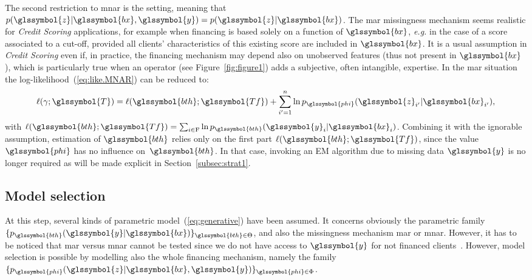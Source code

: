 The second restriction to \gls{mnar} is the  setting, meaning that $p(\glssymbol{z}| \glssymbol{bx},\glssymbol{y}) = p(\glssymbol{z}|\glssymbol{bx})$. The \gls{mar} missingness mechanism seems realistic for \textit{Credit Scoring} applications, for example when financing is based solely on a function of $\glssymbol{bx}$, {\it e.g.} in the case of a score associated to a cut-off, provided all clients' characteristics of this existing \gls{score} are included in $\glssymbol{bx}$. It is a usual assumption in \textit{Credit Scoring} even if, in practice, the financing mechanism may depend also on unobserved features (thus not present in $\glssymbol{bx}$), which is particularly true when an operator (see Figure~\ref{fig:figure1}) adds a subjective, often intangible, expertise. In the \gls{mar} situation the log-likelihood~(\ref{eq:like.MNAR}) can be reduced to:
\begin{equation}\label{eq:like.MAR}
\ell(\gamma;\glssymbol{T}) = \ell(\glssymbol{bth};\glssymbol{Tf}) + \sum_{i'=1}^n \ln p_{\glssymbol{phi}}(\glssymbol{z}_{i'} | \glssymbol{bx}_{i'}),
\end{equation}
with $\ell(\glssymbol{bth};\glssymbol{Tf})=\sum_{i\in\text{F}}\ln p_{\glssymbol{bth}}(\glssymbol{y}_i | \glssymbol{bx}_i)$.
Combining it with the ignorable assumption, estimation of $\glssymbol{bth}$ relies only on the first part $\ell(\glssymbol{bth};\glssymbol{Tf})$, since the value $\glssymbol{phi}$ has no influence on~$\glssymbol{bth}$. In that case, invoking an EM algorithm due to missing data $\glssymbol{y}$ is no longer required as will be made explicit in Section~\ref{subsec:strat1}.

\subsection{Model selection} \label{subsec:model_selection}

At this step, several kinds of parametric model~(\ref{eq:generative}) have been assumed. It concerns obviously the parametric family $\{p_{\glssymbol{bth}}(\glssymbol{y}|\glssymbol{bx})\}_{\glssymbol{bth} \in\Theta}$, and also the missingness mechanism \gls{mar} or \gls{mnar}. 
However, it has to be noticed that \gls{mar} versus \gls{mnar} cannot be tested since we do not have access to $\glssymbol{y}$ for not financed clients~\cite{molenberghs2008every}. However, model selection is possible by modelling also the whole financing mechanism, namely the family $\{p_{\glssymbol{phi}}(\glssymbol{z}|\glssymbol{bx},\glssymbol{y})\}_{\glssymbol{phi} \in \Phi}$.



